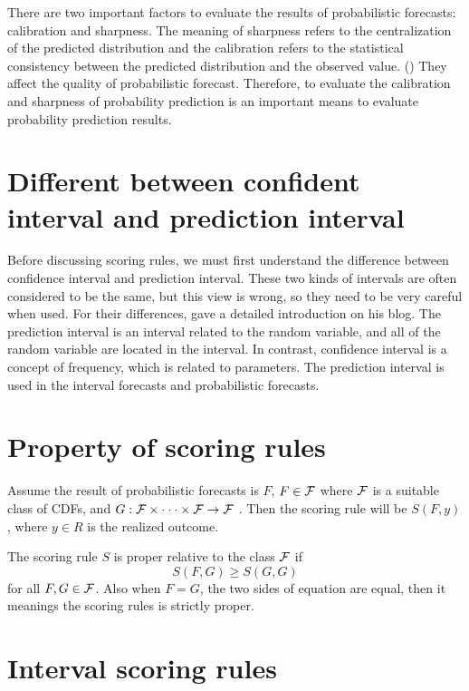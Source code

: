 \documentclass{monashthesis}
\theoremstyle{definition}
\theoremstyle{definition}
\theoremstyle{definition}
\theoremstyle{remark}
\begin{document}
There are two important factors to evaluate the results of probabilistic
forecasts: calibration and sharpness. The meaning of sharpness refers to
the centralization of the predicted distribution and the calibration
refers to the statistical consistency between the predicted distribution
and the observed value. (\textcite{GBR07}) They affect the quality of
probabilistic forecast. Therefore, to evaluate the calibration and
sharpness of probability prediction is an important means to evaluate
probability prediction results.

\section{Different between confident interval and prediction
interval}\label{different-between-confident-interval-and-prediction-interval}

Before discussing scoring rules, we must first understand the difference
between confidence interval and prediction interval. These two kinds of
intervals are often considered to be the same, but this view is wrong,
so they need to be very careful when used. For their differences,
\textcite{RH13} gave a detailed introduction on his blog. The prediction
interval is an interval related to the random variable, and all of the
random variable are located in the interval. In contrast, confidence
interval is a concept of frequency, which is related to parameters. The
prediction interval is used in the interval forecasts and probabilistic
forecasts.

\section{Property of scoring rules}\label{property-of-scoring-rules}

Assume the result of probabilistic forecasts is \(F\), \(F \in \cal{F}\)
where \(\cal{F}\) is a suitable class of CDFs, and
\(G:\cal{F\times\cdot\cdot\cdot\times F\to F}\) . Then the scoring rule
will be \(S(F,y)\), where \(y \in R\) is the realized outcome.

The scoring rule \(S\) is proper relative to the class \(\cal{F}\) if
\[S(F,G)\geq S(G,G)\] for all \(F,G \in \cal{F}\). Also when \(F=G\),
the two sides of equation are equal, then it meanings the scoring rules
is strictly proper.

\section{Interval scoring rules}\label{interval-scoring-rules}
\end{document}
